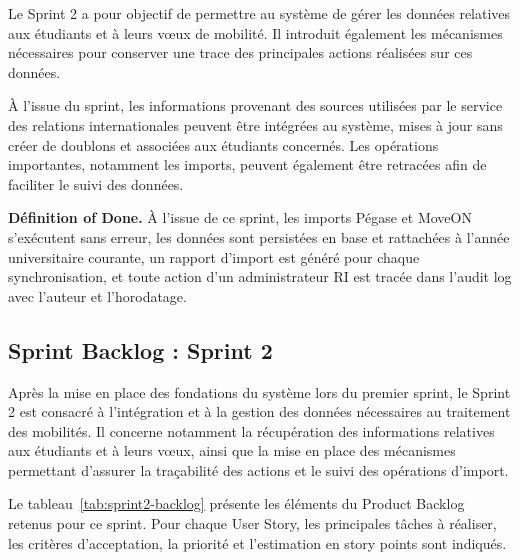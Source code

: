 Le Sprint 2 a pour objectif de permettre au système de gérer les données relatives aux étudiants et à leurs vœux de mobilité. Il introduit également les mécanismes nécessaires pour conserver une trace des principales actions réalisées sur ces données.

À l'issue du sprint, les informations provenant des sources utilisées par le service des relations internationales peuvent être intégrées au système, mises à jour sans créer de doublons et associées aux étudiants concernés. Les opérations importantes, notamment les imports, peuvent également être retracées afin de faciliter le suivi des données.

\textbf{Définition of Done.} À l'issue de ce sprint, les imports Pégase et MoveON s'exécutent sans erreur, les données sont persistées en base et rattachées à l'année universitaire courante, un rapport d'import est généré pour chaque synchronisation, et toute action d'un administrateur RI est tracée dans l'audit log avec l'auteur et l'horodatage.

\setcounter{tasknum}{1}

\subsection{Sprint Backlog : Sprint 2}

Après la mise en place des fondations du système lors du premier sprint, le Sprint 2 est consacré à l'intégration et à la gestion des données nécessaires au traitement des mobilités. Il concerne notamment la récupération des informations relatives aux étudiants et à leurs vœux, ainsi que la mise en place des mécanismes permettant d'assurer la traçabilité des actions et le suivi des opérations d'import.

Le tableau~\ref{tab:sprint2-backlog} présente les éléments du Product Backlog retenus pour ce sprint. Pour chaque User Story, les principales tâches à réaliser, les critères d'acceptation, la priorité et l'estimation en story points sont indiqués.

\begingroup

\footnotesize

\setlength{\tabcolsep}{3pt}

\renewcommand{\arraystretch}{1.6}

